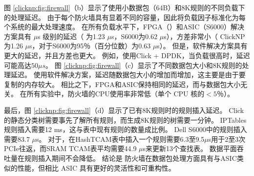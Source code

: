 图 \ref {clicknp:fig:firewall}（b）显示了使用小数据包（64B）和8K规则的不同负载下的处理延迟。
由于每个防火墙具有显着不同的容量，因此将负载因子标准化为每个系统的最大处理速度。
在所有负载水平下，FPGA（\name{}）和ASIC（S6000）解决方案具有 $\mu$s 级别的延迟（\name{} 为1.23 $\mu$s，S6000为0.62 $\mu$s），方差非常小（ ClickNP为1.26 $\mu$s，对于S6000为95％（百分位数）为0.63 $\mu$s）。
但是，软件解决方案具有更大的延迟，并且方差也更大。
例如，使用Click + DPDK，当负载很高时，延迟可能高达$ 50 \mu{}s $。
图 \ref {clicknp:fig:firewall}（c）显示了不同数据包大小和8K规则的处理延迟。
使用软件解决方案，延迟随数据包大小的增加而增加，这主要是由于要复制的内存较大。
相比之下，FPGA和ASIC保持相同的延迟，而与数据包大小无关。
在所有实验中，\name 防火墙的CPU使用率非常低（单个 CPU 核的$ <5 ％$）。

最后，图 \ref {clicknp:fig:firewall}（d）显示了已有8K规则时的规则插入延迟。 Click的静态分类树需要事先了解所有规则，而生成8K规则的树需要一分钟。
IPTables规则插入需要12 ms，这与表中现有规则的数量成比例。
Dell S6000中的规则插入需要83.7 $\mu$s。
对于\name{}，在HashTCAM表中插入一个规则需要6.3至9.5$\mu$s用于2至3次PCIe往返，而SRAM TCAM表平均需要44.9 $\mu$s来更新13个查找表。
\name 数据平面吞吐量在规则插入期间不会降低。
结论是 \name{} 防火墙在数据包处理方面具有与ASIC类似的性能，但相比 ASIC 具有更好的灵活性和可重构性。



